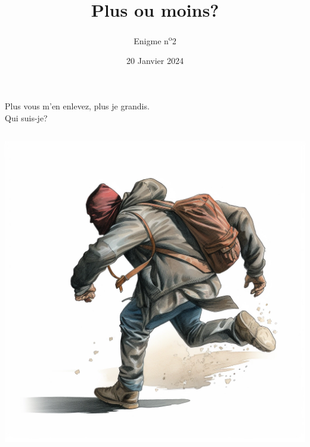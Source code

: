 \documentclass[a4paper, top=10mm]{article}
\title{\textbf{\huge{Plus ou moins?}}}
\author{Enigme n\textsuperscript{o}2}
\date{20 Janvier 2024}
\begin{document}
	\maketitle
	
	\huge
	Plus vous m'en enlevez, plus je grandis.\\
	Qui suis-je?
	
	\vspace{3cm}
	
	\begin{center}
		\includegraphics[height=400pt]{02robber.png}
	\end{center}
	
\end{document}
